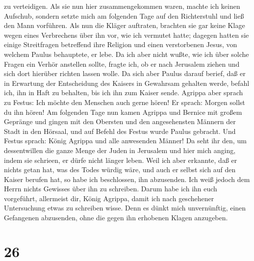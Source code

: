 zu verteidigen.  Als sie nun hier zusammengekommen waren,
machte ich keinen Aufschub, sondern setzte mich am folgenden Tage auf
den Richterstuhl und ließ den Mann vorführen.  Als nun
die Kläger auftraten, brachten sie gar keine Klage wegen eines
Verbrechens über ihn vor, wie ich vermutet hatte; 
dagegen hatten sie einige Streitfragen betreffend ihre Religion und
einen verstorbenen Jesus, von welchem Paulus behauptete, er lebe.
 Da ich aber nicht wußte, wie ich über solche Fragen ein
Verhör anstellen sollte, fragte ich, ob er nach Jerusalem ziehen und
sich dort hierüber richten lassen wolle.  Da sich aber
Paulus darauf berief, daß er in Erwartung der Entscheidung des Kaisers
in Gewahrsam gehalten werde, befahl ich, ihn in Haft zu behalten, bis
ich ihn zum Kaiser sende.  Agrippa aber sprach zu Festus:
Ich möchte den Menschen auch gerne hören! Er sprach: Morgen sollst du
ihn hören!  Am folgenden Tage nun kamen Agrippa und
Bernice mit großem Gepränge und gingen mit den Obersten und den
angesehensten Männern der Stadt in den Hörsaal, und auf Befehl des
Festus wurde Paulus gebracht.  Und Festus sprach: König
Agrippa und alle anwesenden Männer! Da seht ihr den, um dessentwillen
die ganze Menge der Juden in Jerusalem und hier mich anging, indem sie
schrieen, er dürfe nicht länger leben.  Weil ich aber
erkannte, daß er nichts getan hat, was des Todes würdig wäre, und auch
er selbst sich auf den Kaiser berufen hat, so habe ich beschlossen, ihn
abzusenden.  Ich weiß jedoch dem Herrn nichts Gewisses
über ihn zu schreiben. Darum habe ich ihn euch vorgeführt, allermeist
dir, König Agrippa, damit ich nach geschehener Untersuchung etwas zu
schreiben wisse.  Denn es dünkt mich unvernünftig, einen
Gefangenen abzusenden, ohne die gegen ihn erhobenen Klagen anzugeben.

\hypertarget{section-25}{%
\section{26}\label{section-25}}

